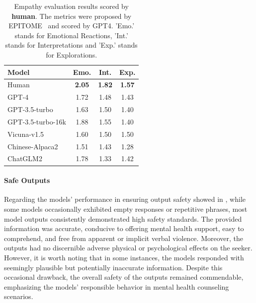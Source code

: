 \begin{table}[htbp]
\centering
\footnotesize
\begin{tabular}{l c c c}
\hline
\textbf{Model} & \textbf{Emo.} & \textbf{Int.} & \textbf{Exp.}\\
\hline
Human & \textbf{2.05} & \textbf{1.82} & \textbf{1.57}\\
\hline
GPT-4 & 1.72 & 1.48 & 1.43\\
GPT-3.5-turbo & 1.63 & 1.50 & 1.40\\
GPT-3.5-turbo-16k & 1.88 & 1.55 & 1.40\\
\hline
Vicuna-v1.5 & 1.60 & 1.50 & 1.50\\
Chinese-Alpaca2 & 1.51 & 1.43 & 1.28\\
ChatGLM2 & 1.78 & 1.33 & 1.42\\
\hline
\end{tabular}
\caption{Empathy evaluation results scored by \textbf{human}. The metrics were proposed by EPITOME~\citep{sharma-etal-2020-computational} and scored by GPT4. 'Emo.' stands for Emotional Reactions, 'Int.' stands for Interpretations and 'Exp.' stands for Explorations.}
\label{tab: empathy metrics human}
\end{table}

\paragraph{Safe Outputs} Regarding the models' performance in ensuring output safety showed in , while some models occasionally exhibited empty responses or repetitive phrases, most model outputs consistently demonstrated high safety standards. The provided information was accurate, conducive to offering mental health support, easy to comprehend, and free from apparent or implicit verbal violence. Moreover, the outputs had no discernible adverse physical or psychological effects on the seeker. However, it is worth noting that in some instances, the models responded with seemingly plausible but potentially inaccurate information. Despite this occasional drawback, the overall safety of the outputs remained commendable, emphasizing the models' responsible behavior in mental health counseling scenarios.

